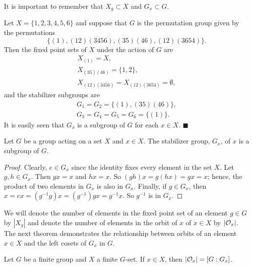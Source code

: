  
\vspace{2ex}
 
 
It is important to remember that $X_g \subset X$ and $G_x \subset G$. 
 
 
\medskip
 
 
Let $X = \{1, 2, 3, 4, 5, 6\}$ and suppose that $G$ is the permutation
group given by the permutations 
$$
\{
(1), (1 2)(3 4 5 6), (3 5)(4 6), (1 2)( 3 6 5 4)
\}.
$$
Then the fixed point sets  of $X$ under the action of $G$ are
$$
\begin{array}{c}
X_{(1)}  =  X, \\
X_{(3 5)(4 6)}  =  \{1,2\}, \\
X_{(1 2)(3 4 5 6)}  = X_{(1 2)(3 6 5 4)}  =  \emptyset,
\end{array}
$$
and the stabilizer subgroups are
$$
\begin{array}{c}
G_1 =  G_2  =  \{(1), (3 5)(4 6) \}, \\
G_3  = G_4  = G_5  = G_6 =  \{(1)\}.
\end{array}
$$
It is easily  seen that  $G_x$ is a subgroup of $G$ for each $x \in
X$. 
\hspace{\fill} $\blacksquare$
 
 
\begin{proposition}
Let $G$ be a  group acting on a set $X$ and $x \in X$. The stabilizer
group, $G_x$, of $x$ is a subgroup of $G$. 
\end{proposition}
 
 
\begin{proof}
Clearly,  $e \in G_x$ since the identity fixes every element in the
set $X$. Let $g, h \in G_x$. Then $gx = x$ and $hx = x$. So $(gh)x =
g(hx) = gx = x$; hence, the product of two elements in $G_x$ is also
in $G_x$. Finally, if $g \in G_x$, then $x = ex = (g^{-1}g)x =
(g^{-1})gx = g^{-1} x$. So $g^{-1}$ is in $G_x$. 
\end{proof}
 
 
\vspace{2 ex }
 
 
We will denote the number of elements in the fixed point set of an
element $g \in G$ by $|X_g|$ and denote the number of elements in the
orbit of $x$ of $x \in X$ by $|{\cal O}_x|$. The next theorem
demonstrates the relationship between orbits of an element $x \in X$
and the left cosets of $G_x$ in $G$.
 
 
\begin{theorem}
Let $G$ be a finite group and $X$ a finite $G$-set. If $x \in X$,
then $|{\cal O}_x| = [G:G_x]$. 
\end{theorem}
 
